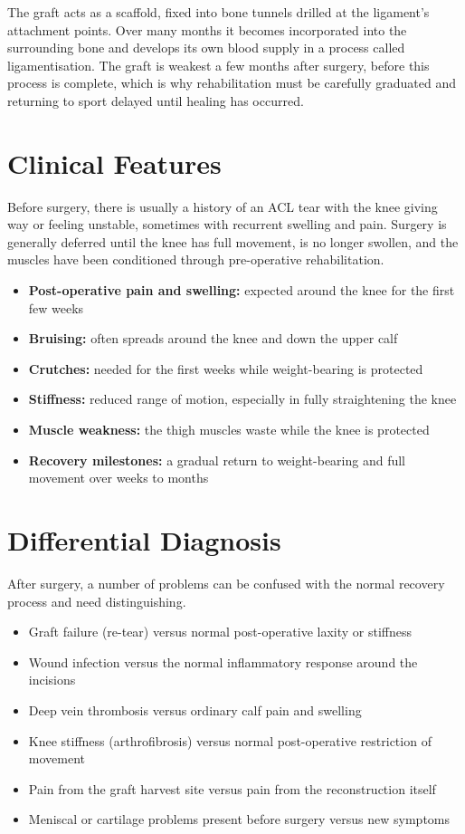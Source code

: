 The graft acts as a scaffold, fixed into bone tunnels drilled at the ligament's attachment points. Over many months it becomes incorporated into the surrounding bone and develops its own blood supply in a process called ligamentisation. The graft is weakest a few months after surgery, before this process is complete, which is why rehabilitation must be carefully graduated and returning to sport delayed until healing has occurred.

\section*{Clinical Features}
Before surgery, there is usually a history of an ACL tear with the knee giving way or feeling unstable, sometimes with recurrent swelling and pain. Surgery is generally deferred until the knee has full movement, is no longer swollen, and the muscles have been conditioned through pre-operative rehabilitation.

\begin{itemize}
    \item \textbf{Post-operative pain and swelling:} expected around the knee for the first few weeks
    \item \textbf{Bruising:} often spreads around the knee and down the upper calf
    \item \textbf{Crutches:} needed for the first weeks while weight-bearing is protected
    \item \textbf{Stiffness:} reduced range of motion, especially in fully straightening the knee
    \item \textbf{Muscle weakness:} the thigh muscles waste while the knee is protected
    \item \textbf{Recovery milestones:} a gradual return to weight-bearing and full movement over weeks to months
\end{itemize}

\section*{Differential Diagnosis}
After surgery, a number of problems can be confused with the normal recovery process and need distinguishing.

\begin{itemize}
    \item Graft failure (re-tear) versus normal post-operative laxity or stiffness
    \item Wound infection versus the normal inflammatory response around the incisions
    \item Deep vein thrombosis versus ordinary calf pain and swelling
    \item Knee stiffness (arthrofibrosis) versus normal post-operative restriction of movement
    \item Pain from the graft harvest site versus pain from the reconstruction itself
    \item Meniscal or cartilage problems present before surgery versus new symptoms
\end{itemize}

